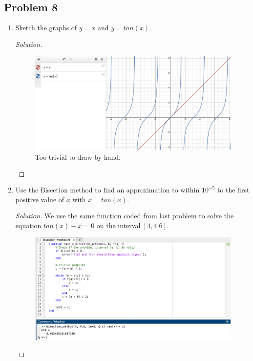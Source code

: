 \documentclass{article}
\begin{document}
\subsection*{Problem 8}
\begin{enumerate}[label=\alph*.]
    \item Sketch the graphs of $y=x$ and $y=tan(x)$.
    \begin{proof}[Solution]\indent 
        \begin{figure}[htb!]
            \centering
            \includegraphics[scale=0.25]{sketch.png}
            \caption{Too trivial to draw by hand.}
        \end{figure}
    \end{proof}
    
    \newpage
    \item Use the Bisection method to find an approximation to within $10^{-5}$ to the first positive 
    value of $x$ with $x = tan(x)$.
    \begin{proof}[Solution]
        We use the same function coded from last problem to solve the equation $tan(x) - x = 0$ on 
        the interval $[4, 4.6]$.
        \begin{figure}[htb!]
            \centering
            \includegraphics[scale=0.25]{8b.png}
        \end{figure}
    \end{proof}
\end{enumerate}
\end{document}
